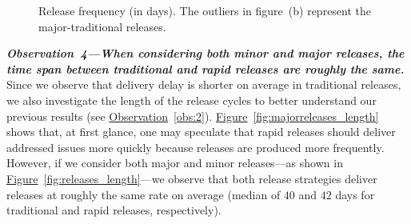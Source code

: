 \begin{figure}[t!]
	\centering
	\caption{Release frequency (in days). The outliers in figure~(b)
		represent the major-traditional releases.}
	\label{fig:release_length_analysis}
\end{figure}

\noindent\textit{\textbf{Observation~4---When considering both
minor and major releases, the time span between traditional and rapid releases
are roughly the same.}}
Since we observe that delivery delay is shorter on average in traditional
releases, we also investigate the length of the release cycles to better
understand our previous results (see \hyperref[obs:2]{Observation}~\ref{obs:2}).
\hyperref[fig:majorreleases_length]{Figure}~\ref{fig:majorreleases_length} shows that, at first glance, one may
speculate that rapid releases should deliver addressed issues more quickly
because releases are produced more frequently.  However, if we consider both
major and minor releases---as shown in \hyperref[fig:releases_length]{Figure}~\ref{fig:releases_length}---we
observe that both release strategies deliver releases at roughly the same rate
on average (median of $40$ and $42$ days for traditional and rapid releases,
respectively).\\

